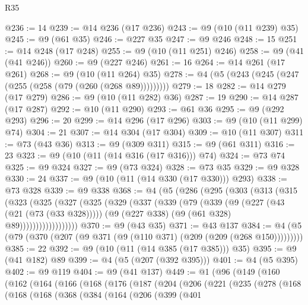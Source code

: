 \begin{lexlean}{R35}
\begin{coremodule}
@236 := 14
@239 := @14 @236 (@17 @236)
@243 := @9 (@10 (@11 @239) @35)
@245 := @9 (@61 @35)
@246 := @227 @35
@247 := @9 @246
@248 := 15
@251 := @14 @248 (@17 @248)
@255 := @9 (@10 (@11 @251) @246)
@258 := @9 (@41 (@41 @246))
@260 := @9 (@227 @246)
@261 := 16
@264 := @14 @261 (@17 @261)
@268 := @9 (@10 (@11 @264) @35)
@278 := @4 (@5 (@243 (@245 (@247 (@255 (@258 (@79 (@260 (@268 @89)))))))))
@279 := 18
@282 := @14 @279 (@17 @279)
@286 := @9 (@10 (@11 @282) @36)
@287 := 19
@290 := @14 @287 (@17 @287)
@292 := @10 (@11 @290)
@293 := @61 @36
@295 := @9 (@292 @293)
@296 := 20
@299 := @14 @296 (@17 @296)
@303 := @9 (@10 (@11 @299) @74)
@304 := 21
@307 := @14 @304 (@17 @304)
@309 := @10 (@11 @307)
@311 := @73 (@43 @36)
@313 := @9 (@309 @311)
@315 := @9 (@61 @311)
@316 := 23
@323 := @9 (@10 (@11 (@14 @316 (@17 @316))) @74)
@324 := @73 @74
@325 := @9 @324
@327 := @9 (@73 @324)
@328 := @73 @35
@329 := @9 @328
@330 := 24
@337 := @9 (@10 (@11 (@14 @330 (@17 @330))) @293)
@338 := @73 @328
@339 := @9 @338
@368 := @4
    (@5
      (@286
        (@295
          (@303
            (@313
              (@315
                (@323
                  (@325
                    (@327
                      (@325
                        (@329
                          (@337
                            (@339
                              (@79
                                (@339
                                  (@9
                                    (@227 (@43 (@21 (@73 (@33 @328)))))
                                    (@9 (@227 @338) (@9 (@61 @328) @89))))))))))))))))))
@370 := @9 (@43 @35)
@371 := @43 @137
@384 := @4 (@5 (@79 (@370 (@207 (@9 @371 (@9 (@110 @371) (@209 (@209 (@268 @150)))))))))
@385 := 22
@392 := @9 (@10 (@11 (@14 @385 (@17 @385))) @35)
@395 := @9 (@41 @182) @89
@399 := @4 (@5 (@207 (@392 @395)))
@401 := @4 (@5 @395)
@402 := @9 @119
@404 := @9 (@41 @137)
@449 := @1
    (@96
      (@149
        (@160
          (@162
            (@164
              (@166
                (@168
                  (@176
                    (@187
                      (@204
                        (@206
                          (@221
                            (@235
                              (@278
                                (@168
                                  (@168
                                    (@168
                                      (@368
                                        (@384
                                          (@164
                                            (@206
                                              (@399
                                                (@401

\end{coremodule}
\end{lexlean}
